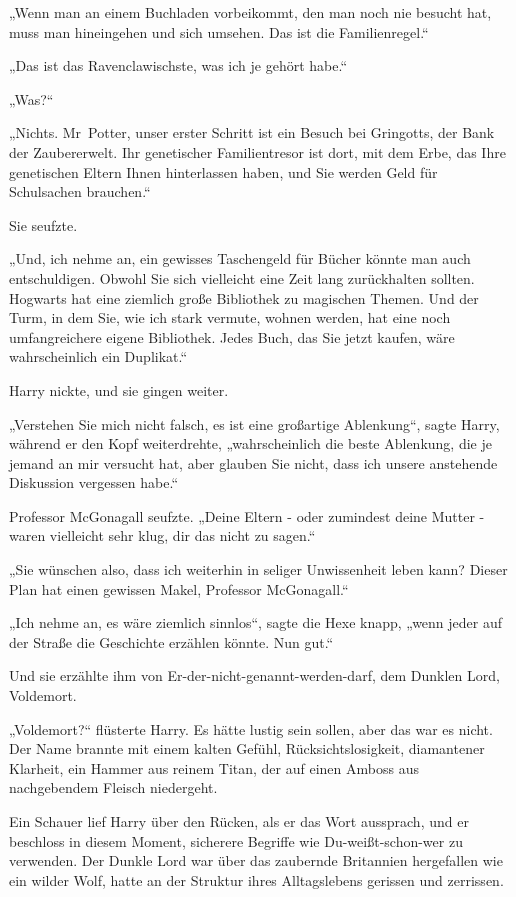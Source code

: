 {„Wenn man an einem Buchladen vorbeikommt, den man noch nie besucht hat, muss man hineingehen und sich umsehen. Das ist die Familienregel.“

„Das ist das Ravenclawischste, was ich je gehört habe.“

„Was?“

„Nichts. Mr~Potter, unser erster Schritt ist ein Besuch bei Gringotts, der Bank der Zaubererwelt. Ihr genetischer Familientresor ist dort, mit dem Erbe, das Ihre genetischen Eltern Ihnen hinterlassen haben, und Sie werden Geld für Schulsachen brauchen.“

Sie seufzte.

„Und, ich nehme an, ein gewisses Taschengeld für Bücher könnte man auch entschuldigen. Obwohl Sie sich vielleicht eine Zeit lang zurückhalten sollten. Hogwarts hat eine ziemlich große Bibliothek zu magischen Themen. Und der Turm, in dem Sie, wie ich stark vermute, wohnen werden, hat eine noch umfangreichere eigene Bibliothek. Jedes Buch, das Sie jetzt kaufen, wäre wahrscheinlich ein Duplikat.“

Harry nickte, und sie gingen weiter.

„Verstehen Sie mich nicht falsch, es ist eine großartige Ablenkung“, sagte Harry, während er den Kopf weiterdrehte, „wahrscheinlich die beste Ablenkung, die je jemand an mir versucht hat, aber glauben Sie nicht, dass ich unsere anstehende Diskussion vergessen habe.“

Professor McGonagall seufzte. „Deine Eltern - oder zumindest deine Mutter - waren vielleicht sehr klug, dir das nicht zu sagen.“

„Sie wünschen also, dass ich weiterhin in seliger Unwissenheit leben kann? Dieser Plan hat einen gewissen Makel, Professor McGonagall.“

„Ich nehme an, es wäre ziemlich sinnlos“, sagte die Hexe knapp, „wenn jeder auf der Straße die Geschichte erzählen könnte. Nun gut.“

Und sie erzählte ihm von Er-der-nicht-genannt-werden-darf, dem Dunklen Lord, Voldemort.

„Voldemort?“ flüsterte Harry. Es hätte lustig sein sollen, aber das war es nicht. Der Name brannte mit einem kalten Gefühl, Rücksichtslosigkeit, diamantener Klarheit, ein Hammer aus reinem Titan, der auf einen Amboss aus nachgebendem Fleisch niedergeht.

Ein Schauer lief Harry über den Rücken, als er das Wort aussprach, und er beschloss in diesem Moment, sicherere Begriffe wie Du-weißt-schon-wer zu verwenden. Der Dunkle Lord war über das zaubernde Britannien hergefallen wie ein wilder Wolf, hatte an der Struktur ihres Alltagslebens gerissen und zerrissen.

}
